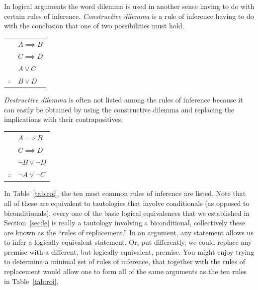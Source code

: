 In logical arguments the word dilemma is used in another sense having to
do with certain rules of inference.  
\emph{Constructive dilemma} is 
a rule of inference having to do with the conclusion that one of two 
possibilities must hold.

\begin{center}
\begin{tabular}{cl}
 & $A \implies B$ \\
 & $C \implies D$ \\ 
 & $A \lor C$ \\ \hline
$\therefore$ & $B \lor D$ \\
\end{tabular}
\end{center}

\emph{Destructive dilemma} 
is often not listed among the rules
of inference because it can easily be obtained by using the constructive
dilemma and replacing the implications with their contrapositives.

\begin{center}
\begin{tabular}{cl}
 & $A \implies B$ \\
 & $C \implies D$ \\ 
 & ${\lnot}B \lor {\lnot}D$ \\ \hline
$\therefore$ & ${\lnot}A \lor {\lnot}C$ \\
\end{tabular}
\end{center}

In Table~\ref{tab:roi}, the ten most common 
rules of inference are listed.  
Note that all of these are equivalent to tautologies that
involve conditionals (as opposed to biconditionals), every one of the 
basic logical equivalences that we established in Section~\ref{sec:le}
is really a tautology involving a biconditional, collectively these are
known as the ``rules of replacement.''  
In an argument, any statement
allows us to infer a logically equivalent statement.  Or, put differently,
we could replace any premise with a different, but logically equivalent,
premise.  You might enjoy trying to determine a minimal set of rules of
inference, that together with the rules of replacement would allow one
to form all of the same arguments as the ten rules in Table~\ref{tab:roi}.
  
